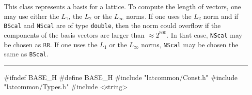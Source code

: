 % 
% 
% 
% 


This class represents a basis for a lattice.
To compute the length of vectors, one may use either 
the $L_1$, the $L_2$ or the $L_\infty$ norms. If one uses
the $L_2$ norm and if \texttt{BScal} and \texttt{NScal} 
are of type \texttt{double}, then the norm could
overflow if the  components of the  basis vectors are larger than
$\approx 2^{500}$. In that case, \texttt{NScal} may be chosen as
\texttt{RR}.  If one uses
the $L_1$ or the $L_\infty$ norms, \texttt{NScal} may be chosen
the same as  \texttt{BScal}.

\bigskip\hrule
\code\hide
#ifndef BASE_H
#define BASE_H
\endhide
#include "latcommon/Const.h"
#include "latcommon/Types.h"
#include <string>


